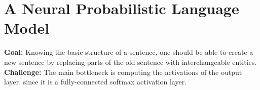 \documentclass[11pt,a4paper]{article}
\begin{document}


\section{A Neural Probabilistic Language Model} %
\label{sec:a_neural_probabilistic_language_model}

  \textbf{Goal:}
  Knowing the basic structure of a sentence, one should be able to create a new sentence by replacing parts of the old sentence with interchangeable entities\cite{bengio2003neural}.\\

  \textbf{Challenge:}
  The main bottleneck is computing the activations of the output layer, since it is a fully-connected softmax activation layer. \\
\end{document}
